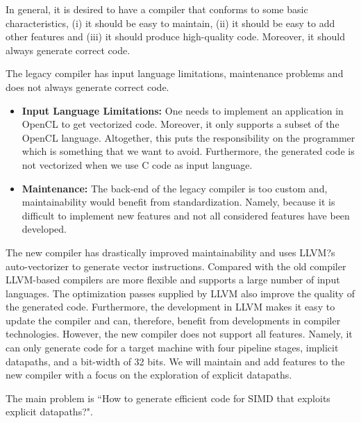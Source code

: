 In general, it is desired to have a compiler that conforms to some basic characteristics, (i) it should be easy to maintain, (ii) it should be easy to add other features and (iii) it should produce high-quality code. Moreover, it should always generate correct code.

The legacy compiler has input language limitations, maintenance problems and 
does not always generate correct code.
\begin{itemize}
\item \textbf{Input Language Limitations:} One needs to implement an application in OpenCL to get vectorized code. Moreover, it only supports a subset of the OpenCL language. Altogether, this puts the responsibility on the programmer which is something that we want to avoid. Furthermore, the generated code is not vectorized when we use C code as input language. 
\item \textbf{Maintenance:} The back-end of the legacy compiler is too custom and, maintainability would benefit from standardization. Namely, because it is difficult to implement new features and not all considered features have been developed.   
\end{itemize}

The new compiler has drastically improved maintainability and uses LLVM?s auto-vectorizer to generate vector instructions. Compared with the old compiler LLVM-based compilers are more flexible and supports a large number of input languages. The optimization passes supplied by LLVM also improve the quality of the generated code. Furthermore, the development in LLVM makes it easy to update the compiler and can, therefore, benefit from developments in compiler technologies. However, the new compiler does not support all features. Namely, it can only generate code for a target machine with four pipeline stages, implicit datapaths, and a bit-width of 32 bits. We will maintain and add features to the new compiler with a focus on the exploration of explicit datapaths.

The main problem is ``How to generate efficient code for SIMD that exploits explicit datapaths?". 


